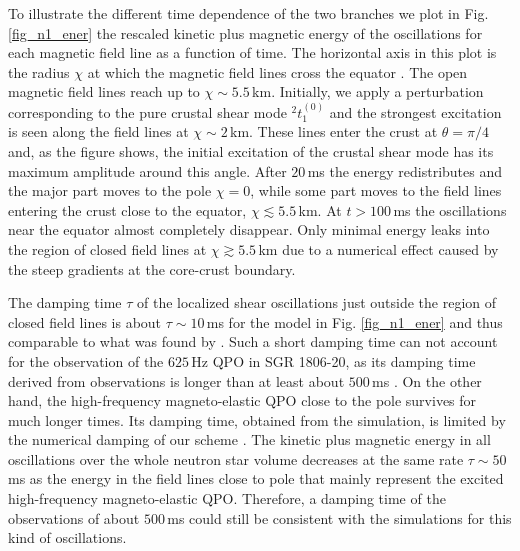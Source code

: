 \documentclass[useAMS,usenatbib]{mnras}
\begin{document}
To illustrate the different time dependence of the two branches we plot in 
Fig.\,\ref{fig_n1_ener} the rescaled kinetic plus magnetic energy of the 
oscillations for each magnetic field line as a function 
of time.  The horizontal axis in this plot is the radius $\chi$ at which the 
magnetic field lines cross the equator \citep{Cerda2008}. The open magnetic 
field lines reach up to $\chi\sim5.5\,$km. Initially, we apply a 
perturbation corresponding to the pure 
crustal shear mode $^2t^{(0)}_1$ and the strongest excitation is seen along the 
field lines at $\chi\sim2\,$km. These lines enter the crust at $\theta=\pi/4$ 
and, as the figure shows, the initial excitation of the crustal shear mode has its 
maximum amplitude around this angle. After $20\,$ms the energy redistributes 
and the major part moves to the pole $\chi=0$, while some part moves to the 
field lines entering the crust close to the equator, $\chi\lesssim5.5\,$km.
At $t>100\,$ms the oscillations near the equator almost completely disappear.
Only minimal energy leaks into the region of closed field lines at 
$\chi\gtrsim5.5\,$km due to a numerical effect caused by the 
steep gradients at the core-crust boundary.

The damping time $\tau$ of the localized shear oscillations just outside the 
region of closed field lines is about 
$\tau\sim10\,$ms for the model in Fig. \ref{fig_n1_ener} and thus comparable 
to what was found by 
\cite{vanHoven2012}. Such a short damping time can not account for the 
observation of the $625\,$Hz QPO in SGR 1806-20, as its damping time derived 
from observations 
is longer than at least about $500\,$ms \citep{Huppenkothen2014c}.
On the other hand, the high-frequency
magneto-elastic QPO close to the pole survives for much longer 
times. Its damping time, obtained from the simulation, is limited by the numerical damping of our scheme 
\citep[see also][]{Gabler2012}. The kinetic plus magnetic energy in all 
oscillations over the whole neutron star 
volume decreases at the same rate $\tau\sim50\,$ms as the energy in the field 
lines close to pole that mainly represent the excited high-frequency 
magneto-elastic QPO. Therefore, a damping time of the observations of about 
$500\,$ms could still be consistent with the simulations for this kind of 
oscillations.
\end{document}
